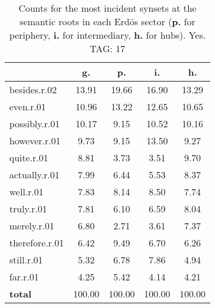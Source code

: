 \begin{table}[h!]
\begin{center}
\begin{tabular}{| l || c | c | c | c |}\hline
 & {\bf g.} & {\bf p.} & {\bf i.} & {\bf h.} \\\hline\hline
besides.r.02 & 13.91  & 19.66  & 16.90  & 13.29 \\\hline
even.r.01 & 10.96  & 13.22  & 12.65  & 10.65 \\\hline
possibly.r.01 & 10.17  & 9.15  & 10.52  & 10.16 \\\hline
however.r.01 & 9.73  & 9.15  & 13.50  & 9.27 \\\hline
quite.r.01 & 8.81  & 3.73  & 3.51  & 9.70 \\\hline
actually.r.01 & 7.99  & 6.44  & 5.53  & 8.37 \\\hline
well.r.01 & 7.83  & 8.14  & 8.50  & 7.74 \\\hline
truly.r.01 & 7.81  & 6.10  & 6.59  & 8.04 \\\hline
merely.r.01 & 6.80  & 2.71  & 3.61  & 7.37 \\\hline
therefore.r.01 & 6.42  & 9.49  & 6.70  & 6.26 \\\hline
still.r.01 & 5.32  & 6.78  & 7.86  & 4.94 \\\hline
far.r.01 & 4.25  & 5.42  & 4.14  & 4.21 \\\hline\hline
{{\bf total}} & 100.00  & 100.00  & 100.00  & 100.00 \\\hline
\end{tabular}
\caption{Counts for the most incident synsets at the semantic roots in each Erd\"os sector ({\bf p.} for periphery, {\bf i.} for intermediary, {\bf h.} for hubs). Yes. TAG: 17}
\end{center}
\end{table}